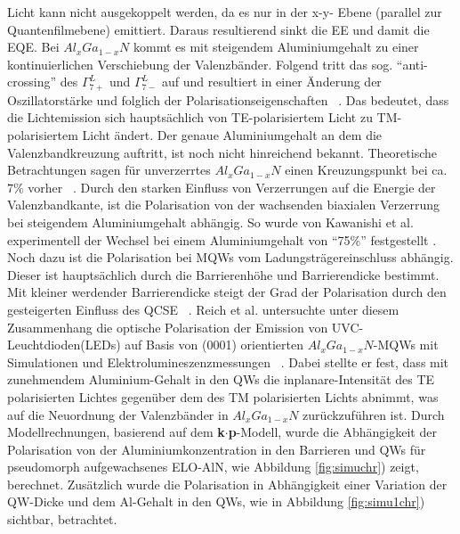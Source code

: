 %
Licht kann nicht ausgekoppelt werden, da es nur in der x-y- Ebene (parallel zur Quantenfilmebene) emittiert. Daraus resultierend sinkt die EE und damit die EQE. Bei $Al_{x}Ga_{1-x}N$ kommt es mit steigendem Aluminiumgehalt zu einer kontinuierlichen Verschiebung der Valenzbänder. Folgend tritt das sog. "`anti-crossing"' des $\Gamma^{L}_{7+}$ und $\Gamma^{L}_{7-}$ auf und resultiert in einer Änderung der Oszillatorstärke und folglich der Polarisationseigenschaften ~\cite{doi:10.1063/1.4932651}.
\newline
Das bedeutet, dass die Lichtemission sich hauptsächlich von TE-polarisiertem Licht zu TM-polarisiertem Licht ändert. Der genaue Aluminiumgehalt an dem die Valenzbandkreuzung auftritt, ist noch nicht hinreichend bekannt. Theoretische Betrachtungen sagen für unverzerrtes $Al_{x}Ga_{1-x}N$ einen Kreuzungspunkt bei ca. $7\%$ vorher ~\cite{doi:10.1063/1.3675451}. Durch den starken Einfluss von Verzerrungen auf die Energie der  Valenzbandkante, ist die Polarisation von der wachsenden biaxialen Verzerrung bei steigendem Aluminiumgehalt abhängig. So wurde von Kawanishi et al. experimentell der Wechsel bei einem Aluminiumgehalt von "`75\%"' festgestellt \cite{doi:10.1063/1.2410242}. 
Noch dazu ist die Polarisation bei MQWs vom Ladungsträgereinschluss abhängig. Dieser ist hauptsächlich durch die Barrierenhöhe und Barrierendicke bestimmt. Mit kleiner werdender Barrierendicke steigt der Grad der Polarisation durch den gesteigerten Einfluss des QCSE ~\cite{PhysRevB.84.035305}. 
\newline
Reich et al. untersuchte unter diesem Zusammenhang die optische Polarisation der Emission von UVC-Leuchtdioden(LEDs) auf Basis von (0001) orientierten $Al_{x}Ga_{1-x}N$-MQWs mit Simulationen und Elektrolumineszenzmessungen ~\cite{doi:10.1063/1.4932651}. Dabei stellte er fest, dass mit zunehmendem Aluminium-Gehalt in den QWs die inplanare-Intensität des TE polarisierten Lichtes gegenüber dem des TM polarisierten Lichts abnimmt, was auf die Neuordnung der Valenzbänder in $Al_{x}Ga_{1-x}N$ zurückzuführen ist. 
\newline
Durch Modellrechnungen, basierend auf dem  \textbf{k$\cdot$p}-Modell, wurde die Abhängigkeit der Polarisation von der Aluminiumkonzentration in den Barrieren und QWs für pseudomorph aufgewachsenes ELO-AlN, wie Abbildung \ref{fig:simuchr}) zeigt, berechnet. Zusätzlich wurde die Polarisation in Abhängigkeit einer Variation der QW-Dicke und dem Al-Gehalt in den QWs, wie in Abbildung \ref{fig:simu1chr}) sichtbar, betrachtet.
